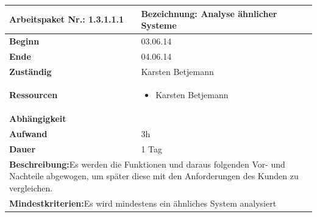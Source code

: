 \documentclass[fontsize=12pt,paper=a4,twoside]{scrartcl}
\begin{document}
\begin{tabular}{|p{5.3cm}|p{9.7cm}|}\hline
	\textbf{Arbeitspaket Nr.:} 1.3.1.1.1 & \textbf{Bezeichnung:} Analyse ähnlicher Systeme\\ \hline \hline
	\textbf{Beginn} & 03.06.14\\ \hline
	\textbf{Ende} & 04.06.14\\ \hline
	\textbf{Zuständig} & Karsten Betjemann\\ \hline
	\textbf{Ressourcen} & \begin{itemize}
		\item Karsten Betjemann
	\end{itemize}    \\ \hline
	\textbf{Abhängigkeit} &\\ \hline
	\textbf{Aufwand} & 3h\\ \hline
	\textbf{Dauer} & 1 Tag\\ \hline
	\multicolumn{2}{|p{15cm}|}{\textbf{Beschreibung:}\newline Es werden die Funktionen und daraus folgenden Vor- und Nachteile abgewogen, um später diese mit den Anforderungen des Kunden zu vergleichen.}\\ \hline
	\multicolumn{2}{|p{15cm}|}{\textbf{Mindestkriterien:}\newline Es wird mindestens ein ähnliches System analysiert}\\ \hline   
\end{tabular}

\begin{verbatim} 
\end{verbatim}
\end{document}
